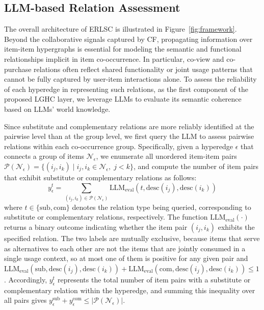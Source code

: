 \subsection{LLM-based Relation Assessment}
The overall architecture of ERLSC is illustrated in Figure~\ref{fig:framework}. Beyond the collaborative signals captured by CF, propagating information over item-item hypergraphs is essential for modeling the semantic and functional relationships implicit in item co-occurrence. In particular, co-view and co-purchase relations often reflect shared functionality or joint usage patterns that cannot be fully captured by user-item interactions alone. To assess the reliability of each hyperedge in representing such relations, as the first component of the proposed LGHC layer, we leverage LLMs to evaluate its semantic coherence based on LLMs' world knowledge.

Since substitute and complementary relations are more reliably identified at the pairwise level than at the group level, we first query the LLM to assess pairwise relations within each co-occurrence group. Specifically, given a hyperedge $\epsilon$ that connects a group of items $\mathcal{N}_{\epsilon}$, we enumerate all unordered item-item pairs $\mathcal{P}(\mathcal{N}_\epsilon) = \{ (i_j, i_k) \mid i_j, i_k \in \mathcal{N}_\epsilon,\; j < k \}$, and compute the number of item pairs that exhibit substitute or complementary relations as follows:
\begin{equation}\label{eq:llm_eval}
        y^{t}_\epsilon = \sum_{(i_j, i_k)\in\mathcal{P}(\mathcal{N}_\epsilon) }\text{LLM}_\text{eval}(t,\text{desc}(i_j),\text{desc}(i_k))
\end{equation}
where $t \in \{\text{sub}, \text{com}\}$ denotes the relation type being queried, corresponding to substitute or complementary relations, respectively. The function $\text{LLM}_{\text{eval}}(\cdot)$ returns a binary outcome indicating whether the item pair $(i_j, i_k)$ exhibits the specified relation. The two labels are mutually exclusive, because items that serve as alternatives to each other are not the items that are jointly consumed in a single usage context, so at most one of them is positive for any given pair and $\text{LLM}_\text{eval}(\text{sub},\text{desc}(i_j),\text{desc}(i_k)) + \text{LLM}_\text{eval}(\text{com},\text{desc}(i_j),\text{desc}(i_k)) \leq 1$. Accordingly, $y^{t}_\epsilon$ represents the total number of item pairs with a substitute or complementary relation within the hyperedge, and summing this inequality over all pairs gives $y^{\text{sub}}_\epsilon + y^{\text{com}}_\epsilon \leq |\mathcal{P}(\mathcal{N}_\epsilon)|$.

